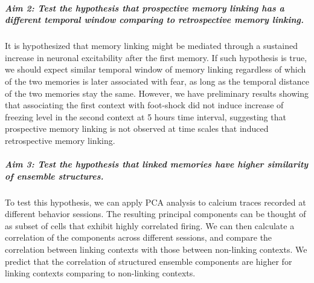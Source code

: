 \documentclass[master.tex]{subfiles}
\begin{document}
\subparagraph{Aim 2: Test the hypothesis that prospective memory linking has a
  different temporal window comparing to retrospective memory linking.} It is
hypothesized that memory linking might be mediated through a sustained increase
in neuronal excitability after the first memory. If such hypothesis is true, we
should expect similar temporal window of memory linking regardless of which of
the two memories is later associated with fear, as long as the temporal distance
of the two memories stay the same. However, we have preliminary results showing
that associating the first context with foot-shock did not induce increase of
freezing level in the second context at 5 hours time interval, suggesting that
prospective memory linking is not observed at time scales that induced
retrospective memory linking.

\subparagraph{Aim 3: Test the hypothesis that linked memories have higher
  similarity of ensemble structures.} To test this hypothesis, we can apply PCA
analysis to calcium traces recorded at different behavior sessions. The
resulting principal components can be thought of as subset of cells that exhibit
highly correlated firing. We can then calculate a correlation of the components
across different sessions, and compare the correlation between linking contexts
with those between non-linking contexts. We predict that the correlation of
structured ensemble components are higher for linking contexts comparing to
non-linking contexts.
\end{document}
